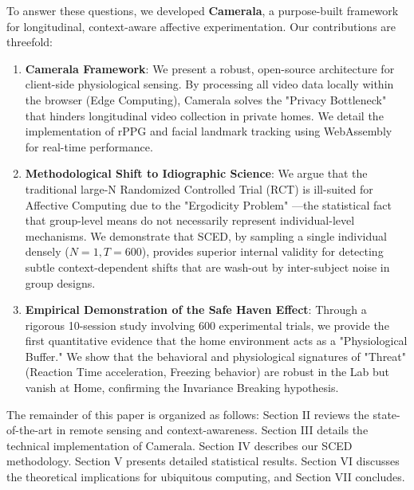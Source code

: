 \documentclass[journal]{IEEEtran}
\begin{document}
To answer these questions, we developed \textbf{Camerala}, a purpose-built framework for longitudinal, context-aware affective experimentation. 
Our contributions are threefold:

\begin{enumerate}
    \item \textbf{Camerala Framework}: We present a robust, open-source architecture for client-side physiological sensing. 
    By processing all video data locally within the browser (Edge Computing), Camerala solves the "Privacy Bottleneck" 
    that hinders longitudinal video collection in private homes. We detail the implementation of rPPG and facial landmark tracking 
    using WebAssembly for real-time performance.
    
    \item \textbf{Methodological Shift to Idiographic Science}: We argue that the traditional large-N Randomized Controlled Trial (RCT) is ill-suited 
    for Affective Computing due to the "Ergodicity Problem" \cite{molenaar_ergodicity}—the statistical fact that group-level means do not necessarily 
    represent individual-level mechanisms. We demonstrate that SCED, by sampling a single individual densely ($N=1, T=600$), 
    provides superior internal validity for detecting subtle context-dependent shifts that are wash-out by inter-subject noise in group designs.
    
    \item \textbf{Empirical Demonstration of the Safe Haven Effect}: Through a rigorous 10-session study involving 600 experimental trials, 
    we provide the first quantitative evidence that the home environment acts as a "Physiological Buffer." 
    We show that the behavioral and physiological signatures of "Threat" (Reaction Time acceleration, Freezing behavior) 
    are robust in the Lab but vanish at Home, confirming the Invariance Breaking hypothesis.
\end{enumerate}

The remainder of this paper is organized as follows: Section II reviews the state-of-the-art in remote sensing and context-awareness. 
Section III details the technical implementation of Camerala. Section IV describes our SCED methodology. 
Section V presents detailed statistical results. Section VI discusses the theoretical implications for ubiquitous computing, and Section VII concludes.

\end{document}
